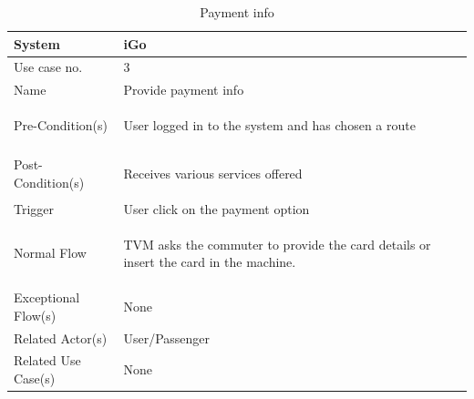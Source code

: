 \documentclass{article}
\begin{document}
\begin{table}[ht]
    \centering
    \begin{tabular}{|l|p{11cm}|}
         \hline
         System& iGo\\
         \hline
         Use case no. & 3 \\
         \hline
         Name & Provide payment info \\
         \hline
         Pre-Condition(s)   & 
         \begin{enumerate*}[itemjoin=\newline]
             \item User logged in to the system and has chosen a route 
         \end{enumerate*} \\
         \hline
         Post-Condition(s)  & 
         \begin{enumerate*}[itemjoin=\newline]
             \item Receives various services offered
         \end{enumerate*} \\
         \hline
         Trigger& User click on the payment option \\
         \hline
         Normal Flow        & 
         \begin{enumerate*}[itemjoin=\newline]
             \item TVM asks the commuter to provide the card details or insert the card in the machine.   
         \end{enumerate*} \\
         \hline
         Exceptional Flow(s)& None\\
         \hline
         Related Actor(s)   & User/Passenger\\
         \hline
         Related Use Case(s)& None\\
         \hline
    \end{tabular}
    \caption{Payment info}
    \label{tab:UC_paymentInfo}
\end{table}
\end{document}
